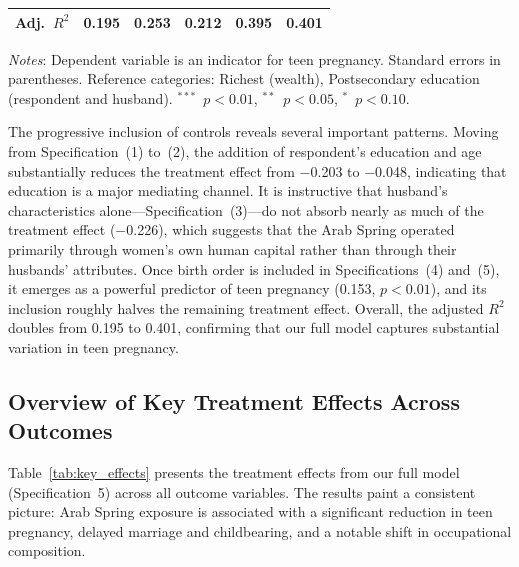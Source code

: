 \documentclass[12pt,a4paper]{article}
\begin{document}
\begin{table}[H]
\begin{threeparttable}
\begin{tabular}{@{}lccccc@{}}
Adj.\ $R^2$      & 0.195  & 0.253  & 0.212  & 0.395  & 0.401 \\
\bottomrule
\end{tabular}
\begin{tablenotes}[flushleft]
\scriptsize
\item \textit{Notes}: Dependent variable is an indicator for teen pregnancy. Standard errors in parentheses. Reference categories: Richest (wealth), Postsecondary education (respondent and husband). $^{***}$~$p<0.01$, $^{**}$~$p<0.05$, $^{*}$~$p<0.10$.
\end{tablenotes}
\end{threeparttable}
\end{table}

\noindent The progressive inclusion of controls reveals several important patterns. Moving from Specification~(1) to~(2), the addition of respondent's education and age substantially reduces the treatment effect from $-$0.203 to $-$0.048, indicating that education is a major mediating channel. It is instructive that husband's characteristics alone---Specification~(3)---do not absorb nearly as much of the treatment effect ($-$0.226), which suggests that the Arab Spring operated primarily through women's own human capital rather than through their husbands' attributes. Once birth order is included in Specifications~(4) and~(5), it emerges as a powerful predictor of teen pregnancy (0.153, $p<0.01$), and its inclusion roughly halves the remaining treatment effect. Overall, the adjusted $R^2$ doubles from 0.195 to 0.401, confirming that our full model captures substantial variation in teen pregnancy.
\vspace{0.25cm}

\subsection{Overview of Key Treatment Effects Across Outcomes}

Table~\ref{tab:key_effects} presents the treatment effects from our full model (Specification~5) across all outcome variables. The results paint a consistent picture: Arab Spring exposure is associated with a significant reduction in teen pregnancy, delayed marriage and childbearing, and a notable shift in occupational composition.
\vspace{0.25cm}
\end{document}
